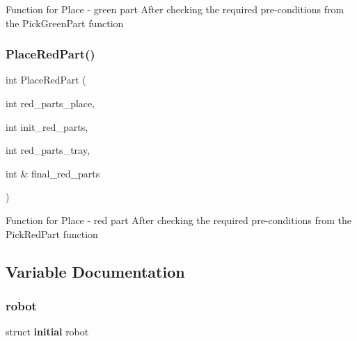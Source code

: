 Function for Place -\/ green part After checking the required pre-\/conditions from the Pick\+Green\+Part function \mbox{\label{main_8cpp_ab55e6f6682d540f985104520e9ddf9a7}} 
\subsubsection{Place\+Red\+Part()}
{\footnotesize\ttfamily int Place\+Red\+Part (\begin{DoxyParamCaption}\item[{int}]{red\+\_\+parts\+\_\+place,  }\item[{int}]{init\+\_\+red\+\_\+parts,  }\item[{int}]{red\+\_\+parts\+\_\+tray,  }\item[{int \&}]{final\+\_\+red\+\_\+parts }\end{DoxyParamCaption})}

Function for Place -\/ red part After checking the required pre-\/conditions from the Pick\+Red\+Part function 

\subsection{Variable Documentation}
\mbox{\label{main_8cpp_ae2b189ac6e2c703db02ee191e55921b7}} 
\subsubsection{robot}
{\footnotesize\ttfamily struct \textbf{ initial} robot}

